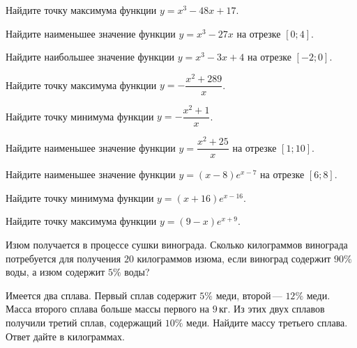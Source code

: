 
\begin{class}[number=1]
	\begin{listofex}
		\item Найдите точку максимума функции \(y=x^3-48x+17\).
		\item Найдите наименьшее значение функции \(y=x^3-27x\) на отрезке \([0;4]\).
		\item Найдите наибольшее значение функции \(y=x^3-3x+4\) на отрезке \([-2;0]\).
		\item Найдите точку максимума функции \(y=-\dfrac{ x^2+289 }{ x }\).
		\item Найдите точку минимума функции \(y=-\dfrac{ x^2+1 }{ x }\).
		\item Найдите наименьшее значение функции \(y=\dfrac{ x^2+25 }{ x }\) на отрезке \([1;10]\).
		\item Найдите наименьшее значение функции \(y=(x-8)e^{x-7}\) на отрезке \([6;8]\).
		\item Найдите точку минимума функции \(y=(x+16)e^{x-16}\).
		\item Найдите точку максимума функции \(y=(9-x)e^{x+9}\).
		\item Изюм получается в процессе сушки винограда. Сколько килограммов винограда потребуется для получения \(20\) килограммов изюма, если виноград содержит \(90\%\) воды, а изюм содержит \(5\%\) воды?
		\item Имеется два сплава. Первый сплав содержит \(5\%\) меди, второй --- \(12\%\) меди. Масса второго сплава больше массы первого на \(9\) кг. Из этих двух сплавов получили третий сплав, содержащий \(10\%\) меди. Найдите массу третьего сплава. Ответ дайте в килограммах.
		

\end{listofex}
\end{class}
